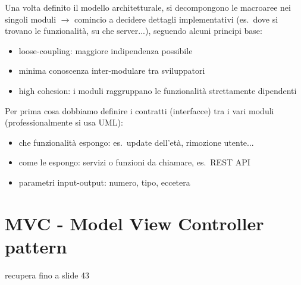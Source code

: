 Una volta definito il modello architetturale, si decompongono le macroaree nei singoli moduli $\rightarrow$ comincio a decidere dettagli implementativi (es.~dove si trovano le funzionalit\`a, su che server...), seguendo alcuni principi base:
\begin{itemize}
  \item loose-coupling: maggiore indipendenza possibile
  \item minima conoscenza inter-modulare tra sviluppatori
  \item high cohesion: i moduli raggruppano le funzionalit\`a strettamente dipendenti
\end{itemize}

Per prima cosa dobbiamo definire i contratti (interfacce) tra i vari moduli (professionalmente si usa UML):
\begin{itemize}
  \item che funzionalit\`a espongo: es.~update dell'et\`a, rimozione utente...
  \item come le espongo: servizi o funzioni da chiamare, es.~REST API
  \item parametri input-output: numero, tipo, eccetera
\end{itemize}

\section{MVC - Model View Controller pattern}

recupera fino a slide 43





